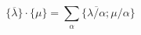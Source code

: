 \begin{equation}
	{\{} \overline{\lambda} {\}}\cdot {\{} {\mu} {\}} = \sum_{\alpha} {\{} 
	\overline{\lambda/\alpha} ; {\mu/\alpha} {\}}
	\label{eq:MixedProduct}
\end{equation}

